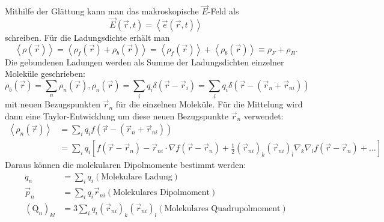 Mithilfe der Glättung kann man das makroskopische $\vec {E}$-Feld als
\begin{equation*}
	\vec {E}\left(\vec {r},t\right)=\left\langle \vec {e}\left(\vec {r},t\right)\right\rangle
\end{equation*}
schreiben. Für die Ladungsdichte erhält man
\begin{equation*}
	\left\langle \rho \left(\vec {r}\right)\right\rangle =\left\langle \rho _{f}\left(\vec {r}\right)+\rho _{b}\left(\vec {r}\right)\right\rangle =\left\langle \rho _{f}\left(\vec {r}\right)\right\rangle +\left\langle \rho _{b}\left(\vec {r}\right)\right\rangle \equiv \rho _{F}+\rho _{B}.
\end{equation*}
Die gebundenen Ladungen werden als Summe der Ladungsdichten einzelner Moleküle geschrieben:
\begin{equation*}
	\rho _{b}\left(\vec {r}\right)=\sum _{n}\rho _{n}\left(\vec {r}\right), \rho _{n}\left(\vec {r}\right)=\sum _{i}q_{i}\delta \left(\vec {r}-\vec {r}_{i}\right)=\sum _{i}q_{i}\delta \left(\vec {r}-\left(\vec {r}_{n}+\vec {r}_{ni}\right)\right)
\end{equation*}
mit neuen Bezugspunkten $\vec {r}_{n}$ für die einzelnen Moleküle. Für die Mittelung wird dann eine Taylor-Entwicklung um diese neuen Bezugspunkte $\vec {r}_{n}$ verwendet:
\begin{align*}
	\left\langle \rho _{n}\left(\vec {r}\right)\right\rangle &=\sum _{i}q_{i}f\left(\vec {r}-\left(\vec {r}_{n}+\vec {r}_{ni}\right)\right)\\&=\sum _{i}q_{i}\left[f\left(\vec {r}-\vec {r}_{n}\right)-\vec {r}_{ni}\cdot \nabla f\left(\vec {r}-\vec {r}_{n}\right)+\frac{1}{2}\left(\vec {r}_{ni}\right)_{k}\left(\vec {r}_{ni}\right)_{l}\nabla _{k}\nabla _{l}f\left(\vec {r}-\vec {r}_{n}\right)+\ldots \right]
\end{align*}
Daraus können die molekularen Dipolmomente bestimmt werden:
\begin{align*}
		q_{n}                            & =\sum _{i}q_{i} \left(\text{Molekulare Ladung}\right)                                                                        \\
		\vec {p}_{n}                     & =\sum _{i}q_{i}\vec {r}_{ni} \left(\text{Molekulares Dipolmoment}\right)                                                     \\
		\left(\mathrm{Q}_{n}\right)_{kl} & =3\sum _{i}q_{i}\left(\vec {r}_{ni}\right)_{k}\left(\vec {r}_{ni}\right)_{l} \left(\text{Molekulares Quadrupolmoment}\right)
\end{align*}
